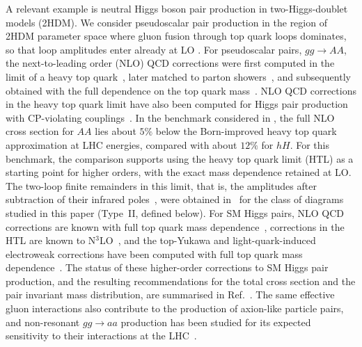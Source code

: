 A relevant example is neutral Higgs boson pair production in
two-Higgs-doublet models (2HDM).
We consider pseudoscalar pair production in the region of 2HDM parameter space where gluon fusion through top quark loops dominates, so that loop amplitudes enter already at LO \cite{Plehn:1996wb,Plehn:1996wbErratum,Baglio:2023euv}.
For pseudoscalar pairs, $gg\to AA$, the next-to-leading order (NLO) QCD corrections were first computed in the limit of a heavy top quark~\cite{DawsonDittmaierSpira1998}, later matched to parton showers~\cite{Hespel:2014sla}, and subsequently obtained with the full dependence on the top quark mass~\cite{Baglio:2023euv}.
NLO QCD corrections in the heavy top quark limit have also been
computed for Higgs pair production with CP-violating
couplings~\cite{Grober:2017gut}.
In the benchmark considered in \cite{Baglio:2023euv}, the
full NLO cross section for $AA$ lies about $5\%$ below the
Born-improved heavy top quark approximation at LHC energies,
compared with about $12\%$ for $hH$. For this benchmark, the
comparison supports using the heavy top quark limit (HTL) as a
starting point for higher orders, with the exact mass dependence retained at LO.
The two-loop finite remainders in this limit, that is, the amplitudes after subtraction of their infrared poles~\cite{Catani:1998bh}, were obtained in~\cite{Bhattacharya:2019bmd} for the class of diagrams studied in this paper (Type~II, defined below).
For SM Higgs pairs, NLO QCD corrections are known with full top
quark mass dependence~\cite{BorowkaEtAl2016,BorowkaEtAl2016Erratum,Baglio:2020ini},
corrections in the HTL are known to N$^3$LO~\cite{deFlorianMazzitelli2013NNLO,Banerjee:2018lfq,ChenEtAl2020},
and the top-Yukawa and light-quark-induced electroweak corrections have been computed with full top quark mass dependence~\cite{Bhattacharya:2025hh}.
The status of these higher-order corrections to SM Higgs pair production, and the resulting recommendations for the total cross section and the pair invariant mass distribution, are summarised in Ref.~\cite{H:2026ksi}.
The same effective gluon interactions also contribute to the production of axion-like particle pairs, and non-resonant $gg\to aa$ production has been studied for its expected sensitivity to their interactions at the LHC~\cite{Brivio:2026alp}.

